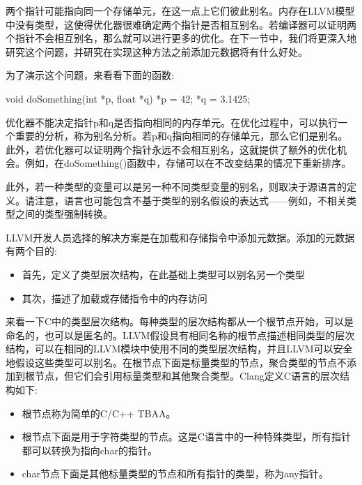 
两个指针可能指向同一个存储单元，在这一点上它们彼此别名。内存在LLVM模型中没有类型，这使得优化器很难确定两个指针是否相互别名。若编译器可以证明两个指针不会相互别名，那么就可以进行更多的优化。在下一节中，我们将更深入地研究这个问题，并研究在实现这种方法之前添加元数据将有什么好处。


为了演示这个问题，来看看下面的函数:

\begin{cpp}
void doSomething(int *p, float *q) {
    *p = 42;
    *q = 3.1425;
}
\end{cpp}

优化器不能决定指针p和q是否指向相同的内存单元。在优化过程中，可以执行一个重要的分析，称为别名分析。若p和q指向相同的存储单元，那么它们是别名。此外，若优化器可以证明两个指针永远不会相互别名，这就提供了额外的优化机会。例如，在doSomething()函数中，存储可以在不改变结果的情况下重新排序。

此外，若一种类型的变量可以是另一种不同类型变量的别名，则取决于源语言的定义。请注意，语言也可能包含不基于类型的别名假设的表达式——例如，不相关类型之间的类型强制转换。

LLVM开发人员选择的解决方案是在加载和存储指令中添加元数据。添加的元数据有两个目的:

\begin{itemize}
\item
首先，定义了类型层次结构，在此基础上类型可以别名另一个类型

\item
其次，描述了加载或存储指令中的内存访问
\end{itemize}

来看一下C中的类型层次结构。每种类型的层次结构都从一个根节点开始，可以是命名的，也可以是匿名的。LLVM假设具有相同名称的根节点描述相同类型的层次结构，可以在相同的LLVM模块中使用不同的类型层次结构，并且LLVM可以安全地假设这些类型可以别名。在根节点下面是标量类型的节点，聚合类型的节点不添加到根节点，但它们会引用标量类型和其他聚合类型。Clang定义C语言的层次结构如下:

\begin{itemize}
\item
根节点称为简单的C/C++ TBAA。

\item
根节点下面是用于字符类型的节点。这是C语言中的一种特殊类型，所有指针都可以转换为指向char的指针。

\item
char节点下面是其他标量类型的节点和所有指针的类型，称为any指针。
\end{itemize}

